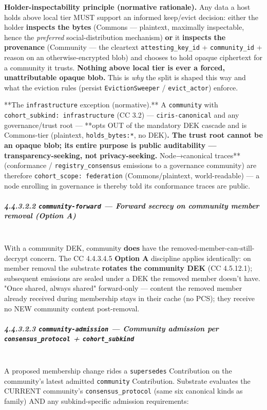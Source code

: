 \documentclass[11pt]{article}
\begin{document}
\textbf{Holder-inspectability principle (normative rationale).} Any data a host holds above local tier MUST support an informed keep/evict decision: either the holder \textbf{inspects the bytes} (Commons — plaintext, maximally inspectable, hence the \textit{preferred} social-distribution mechanism) \textbf{or} it \textbf{inspects the provenance} (Community — the cleartext \texttt{attesting\_key\_id} + \texttt{community\_id} + reason on an otherwise-encrypted blob) and chooses to hold opaque ciphertext for a community it trusts. \textbf{Nothing above local tier is ever a forced, unattributable opaque blob.} This is \textit{why} the split is shaped this way and what the eviction rules (persist \texttt{EvictionSweeper} / \texttt{evict\_actor}) enforce.


**The \texttt{infrastructure} exception (normative).** A \texttt{community} with \texttt{cohort\_subkind: infrastructure} (CC 3.2) — \texttt{ciris-canonical} and any governance/trust root — **opts OUT of the mandatory DEK cascade and is Commons-tier (plaintext, \texttt{holds\_bytes:*}, no DEK)\textbf{. The trust root cannot be an opaque blob; its entire purpose is public auditability — transparency-seeking, not privacy-seeking. }Node→canonical traces** (conformance / \texttt{registry\_consensus} emissions to a governance community) are therefore \texttt{cohort\_scope: federation} (Commons/plaintext, world-readable) — a node enrolling in governance is thereby told its conformance traces are public.


\subparagraph{4.4.3.2.2 \texttt{community-forward} — Forward secrecy on community member removal (Option A)}\mbox{}\\


With a community DEK, community \textbf{does} have the removed-member-can-still-decrypt concern. The CC 4.4.3.4.5 \textbf{Option A} discipline applies identically: on member removal the substrate \textbf{rotates the community DEK} (CC 4.5.12.1); subsequent emissions are sealed under a DEK the removed member doesn't have. "Once shared, always shared" forward-only — content the removed member already received during membership stays in their cache (no PCS); they receive no NEW community content post-removal.


\subparagraph{4.4.3.2.3 \texttt{community-admission} — Community admission per \texttt{consensus\_protocol} + \texttt{cohort\_subkind}}\mbox{}\\


A proposed membership change rides a \texttt{supersedes} Contribution on the community's latest admitted \texttt{community} Contribution. Substrate evaluates the CURRENT community's \texttt{consensus\_protocol} (same six canonical kinds as family) AND any subkind-specific admission requirements:
\end{document}
